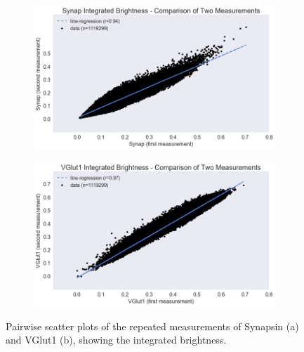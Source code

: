\documentclass{article}
\begin{document}
\begin{figure}
  \centering 
  \begin{subfigure}{\textwidth}
    \includegraphics[width=\textwidth]{figures/data_check01.png}
    \caption{}
    \label{fig:figure2a}
  \end{subfigure}
  \begin{subfigure}{\textwidth}
    \includegraphics[width=\textwidth]{figures/data_check02.png}
    \caption{}
    \label{fig:figure2b}
  \end{subfigure}

  \caption{Pairwise scatter plots of the repeated measurements of Synapsin (a) and VGlut1 (b), showing the integrated brightness.}
  \label{fig:figure2}
\end{figure}
\end{document}
